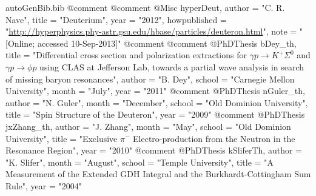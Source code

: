 \begin{filecontents*}{autoGenBib.bib}
@comment %
@comment %
@Misc{ hyperDeut,
  author = "C. R. Nave",
  title = "Deuterium",
  year = "2012",
  howpublished = "\url{http://hyperphysics.phy-astr.gsu.edu/hbase/particles/deuteron.html}",
  note = "[Online; accessed 10-Sep-2013]"
}
@comment %
@comment %
@PhDThesis{ bDey_th,
	title = "{Differential cross section and polarization extractions for $\gamma p \rightarrow K^{+} \Sigma^{0}$ and $\gamma p \rightarrow \phi p$ using CLAS at Jefferson Lab, towards a partial wave analysis in search of missing baryon resonances}",
	author = "B. Dey",
	school = "Carnegie Mellon University",
	month = "July",
	year = "2011"
}
@comment %
@PhDThesis{ nGuler_th,
	author = "N. Guler",
	month = "December",
	school = "Old Dominion University",
	title = "{Spin Structure of the Deuteron}",
	year = "2009"
}
@comment %
@PhDThesis{ jxZhang_th,
	author = "J. Zhang",
	month = "May",
	school = "Old Dominion University",
	title = "{Exclusive $\pi^-$ Electro-production from the Neutron in the Resonance Region}",
	year = "2010"
}
@comment %
@PhDThesis{ kSliferTh,
	author = "K. Slifer",
	month = "August",
	school = "Temple University",
	title = "{A Measurement of the Extended GDH Integral and the Burkhardt-Cottingham Sum Rule}",
	year = "2004"
}


\end{filecontents*}
